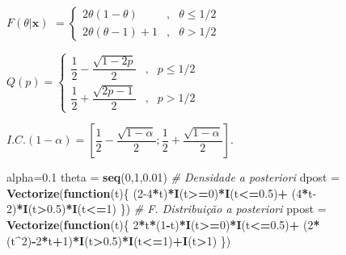 \documentclass[
]{book}
\newenvironment{Shaded}{\begin{snugshade}}{\end{snugshade}}
\newcommand{\CommentTok}[1]{\textcolor[rgb]{0.56,0.35,0.01}{\textit{#1}}}
\newcommand{\ControlFlowTok}[1]{\textcolor[rgb]{0.13,0.29,0.53}{\textbf{#1}}}
\newcommand{\DecValTok}[1]{\textcolor[rgb]{0.00,0.00,0.81}{#1}}
\newcommand{\FloatTok}[1]{\textcolor[rgb]{0.00,0.00,0.81}{#1}}
\newcommand{\KeywordTok}[1]{\textcolor[rgb]{0.13,0.29,0.53}{\textbf{#1}}}
\newcommand{\NormalTok}[1]{#1}
\newcommand{\OperatorTok}[1]{\textcolor[rgb]{0.81,0.36,0.00}{\textbf{#1}}}
\newcommand{\StringTok}[1]{\textcolor[rgb]{0.31,0.60,0.02}{#1}}
\begin{document}
\(F(\theta|\boldsymbol x)\) \(=\left\{\begin{array}{lcc} 2\theta(1-\theta) &,& \theta\leq 1/2\\ 2\theta(\theta-1)+1 &,& \theta>1/2\end{array}\right.\)

\(Q(p)=\left\{\begin{array}{lcc} \dfrac{1}{2}-\dfrac{\sqrt{1-2p}}{2} &,& p\leq 1/2\\ \dfrac{1}{2}+\dfrac{\sqrt{2p-1}}{2} &,& p>1/2\end{array}\right.\)

\(I.C.(1-\alpha)=\left[\dfrac{1}{2}-\dfrac{\sqrt{1-\alpha}}{2};\dfrac{1}{2}+\dfrac{\sqrt{1-\alpha}}{2}\right]\).

\begin{Shaded}
\begin{Highlighting}[]
\NormalTok{alpha=}\FloatTok{0.1}
\NormalTok{theta =}\StringTok{ }\KeywordTok{seq}\NormalTok{(}\DecValTok{0}\NormalTok{,}\DecValTok{1}\NormalTok{,}\FloatTok{0.01}\NormalTok{)}
\CommentTok{# Densidade a posteriori}
\NormalTok{dpost =}\StringTok{ }\KeywordTok{Vectorize}\NormalTok{(}\ControlFlowTok{function}\NormalTok{(t)\{ (}\DecValTok{2-4}\OperatorTok{*}\NormalTok{t)}\OperatorTok{*}\KeywordTok{I}\NormalTok{(t}\OperatorTok{>=}\DecValTok{0}\NormalTok{)}\OperatorTok{*}\KeywordTok{I}\NormalTok{(t}\OperatorTok{<=}\FloatTok{0.5}\NormalTok{)}\OperatorTok{+}
\StringTok{    }\NormalTok{(}\DecValTok{4}\OperatorTok{*}\NormalTok{t}\DecValTok{-2}\NormalTok{)}\OperatorTok{*}\KeywordTok{I}\NormalTok{(t}\OperatorTok{>}\FloatTok{0.5}\NormalTok{)}\OperatorTok{*}\KeywordTok{I}\NormalTok{(t}\OperatorTok{<=}\DecValTok{1}\NormalTok{) \})}
\CommentTok{# F. Distribuição a posteriori}
\NormalTok{ppost =}\StringTok{ }\KeywordTok{Vectorize}\NormalTok{(}\ControlFlowTok{function}\NormalTok{(t)\{ }\DecValTok{2}\OperatorTok{*}\NormalTok{t}\OperatorTok{*}\NormalTok{(}\DecValTok{1}\OperatorTok{-}\NormalTok{t)}\OperatorTok{*}\KeywordTok{I}\NormalTok{(t}\OperatorTok{>=}\DecValTok{0}\NormalTok{)}\OperatorTok{*}\KeywordTok{I}\NormalTok{(t}\OperatorTok{<=}\FloatTok{0.5}\NormalTok{)}\OperatorTok{+}
\StringTok{    }\NormalTok{(}\DecValTok{2}\OperatorTok{*}\NormalTok{(t}\OperatorTok{^}\DecValTok{2}\NormalTok{)}\OperatorTok{-}\DecValTok{2}\OperatorTok{*}\NormalTok{t}\OperatorTok{+}\DecValTok{1}\NormalTok{)}\OperatorTok{*}\KeywordTok{I}\NormalTok{(t}\OperatorTok{>}\FloatTok{0.5}\NormalTok{)}\OperatorTok{*}\KeywordTok{I}\NormalTok{(t}\OperatorTok{<=}\DecValTok{1}\NormalTok{)}\OperatorTok{+}\KeywordTok{I}\NormalTok{(t}\OperatorTok{>}\DecValTok{1}\NormalTok{) \})}

\end{Highlighting}
\end{Shaded}
\end{document}
